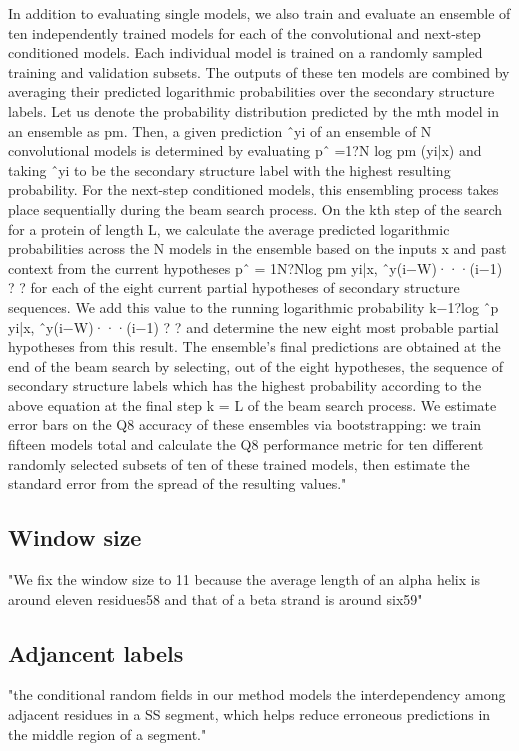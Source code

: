 \documentclass[]{scrartcl}
\begin{document}
In addition to evaluating single models, we also train and evaluate an ensemble of ten independently trained models for each of the convolutional and next-step conditioned models. Each individual model is trained on a randomly sampled training and validation subsets. The outputs of these ten models are combined by averaging their predicted logarithmic probabilities over the secondary structure labels. Let us denote the probability distribution predicted by the mth model in an ensemble as pm. Then, a given prediction ˆyi of an ensemble of N convolutional models is determined by evaluating pˆ =1?N log pm (yi|x) and taking ˆyi to be the secondary structure label with the highest resulting probability. For the next-step conditioned models, this ensembling process takes place sequentially during the beam search process. On the kth step of the search for a protein of length L, we calculate the average predicted logarithmic probabilities across the N models in the ensemble based on the inputs x and past context from the current hypotheses pˆ = 1N?Nlog pm yi|x, ˆy(i−W)···(i−1) ? ? for each of the eight current partial hypotheses of secondary structure sequences. We add this value to the running logarithmic probability k−1?log ˆp yi|x, ˆy(i−W)···(i−1) ? ? and determine the new eight most probable partial hypotheses from this result. The ensemble’s final predictions are obtained at the end of the beam search by selecting, out of the eight hypotheses, the sequence of secondary structure labels which has the highest probability according to the above equation at the final step k = L of the beam search process. We estimate error bars on the Q8 accuracy of these ensembles via bootstrapping: we train fifteen models total and calculate the Q8 performance metric for ten different randomly selected subsets of ten of these trained models, then estimate the standard error from the spread of the resulting values." \cite{Busia2017}

\subsection{Window size}
"We fix the window size to 11 because the average length of an alpha helix is around eleven residues58 and that of a beta strand is around six59" \cite{Wang2016}

\subsection{Adjancent labels}
"the conditional random fields in our method models the interdependency among adjacent residues in a SS segment, which helps reduce erroneous predictions in the middle region of a segment." \cite{Wang2016}
\end{document}
